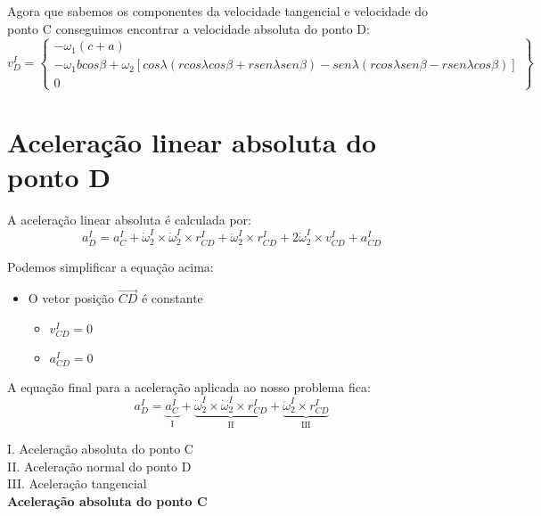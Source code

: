 \documentclass[a4paper, 12pt]{article}
\begin{document}
		Agora que sabemos os componentes da velocidade tangencial e velocidade do ponto C conseguimos encontrar a velocidade absoluta do ponto D:
		\begin{equation}
			v_D^I = \begin{Bmatrix}
			-\omega_1(c+a)\\
			-\omega_1bcos\beta + \omega_2[cos\lambda(rcos\lambda cos\beta + rsen\lambda sen\beta) - sen\lambda (rcos\lambda sen \beta - rsen\lambda cos\beta)]\\
			0
			\end{Bmatrix}
		\end{equation}
		
		
\section{Aceleração linear absoluta do ponto D}
	A aceleração linear absoluta é calculada por:
	\begin{equation}
		a^I_D = a^I_C + \dot{\omega}^I_2 \times \dot{\omega}^I_2 \times r^I_{CD} + \ddot{\omega}^I_2 \times r^I_{CD} + 2 \dot{\omega}^I_2 \times v^I_{CD} + a^I_{CD}
	\end{equation}
		
	Podemos simplificar a equação acima:
		\begin{itemize}
			\item O vetor posição $\vec{CD}$ é constante
				\begin{itemize}
					\item $v^I_{CD} = 0$
					\item $a^I_{CD} = 0$
				\end{itemize} 						
		\end{itemize}
		
		A equação final para a aceleração aplicada ao nosso problema fica:
		\begin{equation}
			a^I_D = \underbrace{a^I_C}_\text{I} + \underbrace{\dot{\omega}^I_2 \times \dot{\omega}^I_2 \times r^I_{CD}}_\text{II} + \underbrace{\ddot{\omega}^I_2 \times r^I_{CD}}_\text{III}
		\end{equation}
		
		I. Aceleração absoluta do ponto C\\
		
		II. Aceleração normal do ponto D\\
		
		III. Aceleração tangencial\\
		
		\textbf{Aceleração absoluta do ponto C}
		
\end{document}
